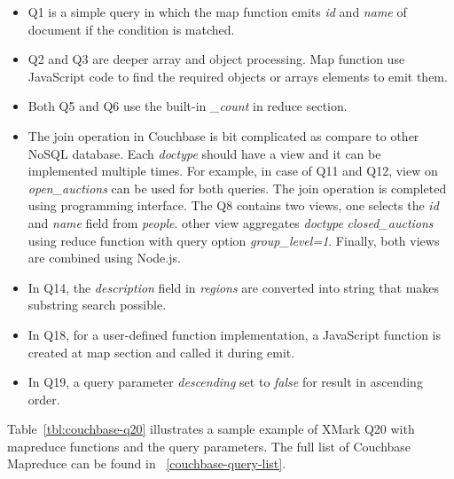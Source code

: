 \begin{itemize}
 \item Q1 is a simple query in which the map function emits \textit{id} and \textit{name} of document if the condition is matched.
 \item Q2 and Q3 are deeper array and object processing. Map function use JavaScript code to find the required objects or arrays elements to emit them. 
 \item Both Q5 and Q6 use the built-in \textit{\_count} in reduce section.
 \item The join operation in Couchbase is bit complicated as compare to other NoSQL database. Each \textit{doctype} should have a view and it can be implemented multiple times. For example, in case of Q11 and Q12, view on 
 \textit{open\_auctions} can be used for both queries.  The join operation is completed using programming interface. The Q8 contains two views, one selects the \textit{id} and \textit{name} field from \textit{people}. other view aggregates \textit{doctype} \textit{closed\_auctions} using reduce function with query option \textit{group\_level=1}. Finally, both views are combined using Node.js. 
 \item In Q14, the \textit{description} field in \textit{regions} are converted into string  that makes substring search possible.
 \newpage
 \item In Q18, for a user-defined function implementation, a JavaScript function is created at map section and called it during emit. 
 \item In Q19, a query parameter \textit{descending} set to \textit{false} for result in ascending order. 
 \end{itemize}
 

 Table~\ref{tbl:couchbase-q20} illustrates a sample example of XMark  Q20 with  mapreduce functions and the query parameters. The full list of Couchbase Mapreduce can be found in ~\ref{couchbase-query-list}.

